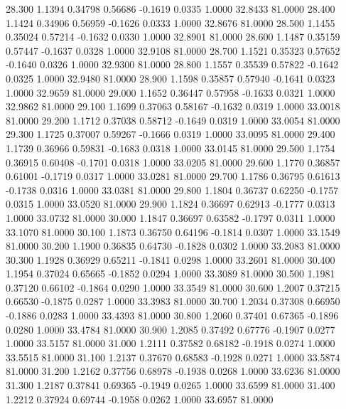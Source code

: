   28.300   1.1394   0.34798   0.56686  -0.1619   0.0335   1.0000  32.8433  81.0000
  28.400   1.1424   0.34906   0.56959  -0.1626   0.0333   1.0000  32.8676  81.0000
  28.500   1.1455   0.35024   0.57214  -0.1632   0.0330   1.0000  32.8901  81.0000
  28.600   1.1487   0.35159   0.57447  -0.1637   0.0328   1.0000  32.9108  81.0000
  28.700   1.1521   0.35323   0.57652  -0.1640   0.0326   1.0000  32.9300  81.0000
  28.800   1.1557   0.35539   0.57822  -0.1642   0.0325   1.0000  32.9480  81.0000
  28.900   1.1598   0.35857   0.57940  -0.1641   0.0323   1.0000  32.9659  81.0000
  29.000   1.1652   0.36447   0.57958  -0.1633   0.0321   1.0000  32.9862  81.0000
  29.100   1.1699   0.37063   0.58167  -0.1632   0.0319   1.0000  33.0018  81.0000
  29.200   1.1712   0.37038   0.58712  -0.1649   0.0319   1.0000  33.0054  81.0000
  29.300   1.1725   0.37007   0.59267  -0.1666   0.0319   1.0000  33.0095  81.0000
  29.400   1.1739   0.36966   0.59831  -0.1683   0.0318   1.0000  33.0145  81.0000
  29.500   1.1754   0.36915   0.60408  -0.1701   0.0318   1.0000  33.0205  81.0000
  29.600   1.1770   0.36857   0.61001  -0.1719   0.0317   1.0000  33.0281  81.0000
  29.700   1.1786   0.36795   0.61613  -0.1738   0.0316   1.0000  33.0381  81.0000
  29.800   1.1804   0.36737   0.62250  -0.1757   0.0315   1.0000  33.0520  81.0000
  29.900   1.1824   0.36697   0.62913  -0.1777   0.0313   1.0000  33.0732  81.0000
  30.000   1.1847   0.36697   0.63582  -0.1797   0.0311   1.0000  33.1070  81.0000
  30.100   1.1873   0.36750   0.64196  -0.1814   0.0307   1.0000  33.1549  81.0000
  30.200   1.1900   0.36835   0.64730  -0.1828   0.0302   1.0000  33.2083  81.0000
  30.300   1.1928   0.36929   0.65211  -0.1841   0.0298   1.0000  33.2601  81.0000
  30.400   1.1954   0.37024   0.65665  -0.1852   0.0294   1.0000  33.3089  81.0000
  30.500   1.1981   0.37120   0.66102  -0.1864   0.0290   1.0000  33.3549  81.0000
  30.600   1.2007   0.37215   0.66530  -0.1875   0.0287   1.0000  33.3983  81.0000
  30.700   1.2034   0.37308   0.66950  -0.1886   0.0283   1.0000  33.4393  81.0000
  30.800   1.2060   0.37401   0.67365  -0.1896   0.0280   1.0000  33.4784  81.0000
  30.900   1.2085   0.37492   0.67776  -0.1907   0.0277   1.0000  33.5157  81.0000
  31.000   1.2111   0.37582   0.68182  -0.1918   0.0274   1.0000  33.5515  81.0000
  31.100   1.2137   0.37670   0.68583  -0.1928   0.0271   1.0000  33.5874  81.0000
  31.200   1.2162   0.37756   0.68978  -0.1938   0.0268   1.0000  33.6236  81.0000
  31.300   1.2187   0.37841   0.69365  -0.1949   0.0265   1.0000  33.6599  81.0000
  31.400   1.2212   0.37924   0.69744  -0.1958   0.0262   1.0000  33.6957  81.0000
